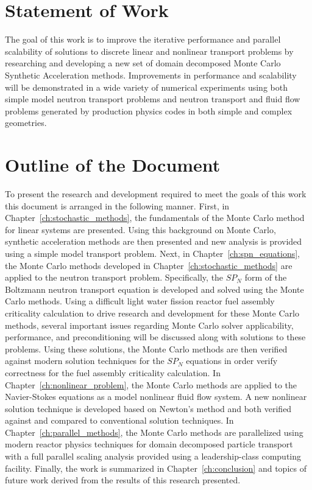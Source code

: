 \section{Statement of Work}
\label{sec:statement_of_work}

The goal of this work is to improve the iterative performance and
parallel scalability of solutions to discrete linear and nonlinear
transport problems by researching and developing a new set of domain
decomposed Monte Carlo Synthetic Acceleration methods. Improvements in
performance and scalability will be demonstrated in a wide variety of
numerical experiments using both simple model neutron transport
problems and neutron transport and fluid flow problems generated by
production physics codes in both simple and complex geometries.

\section{Outline of the Document}
\label{sec:doc_outline}

To present the research and development required to meet the goals of
this work this document is arranged in the following manner. First, in
Chapter~\ref{ch:stochastic_methods}, the fundamentals of the Monte
Carlo method for linear systems are presented. Using this background
on Monte Carlo, synthetic acceleration methods are then presented and
new analysis is provided using a simple model transport problem. Next,
in Chapter~\ref{ch:spn_equations}, the Monte Carlo methods developed
in Chapter~\ref{ch:stochastic_methods} are applied to the neutron
transport problem. Specifically, the $SP_N$ form of the Boltzmann
neutron transport equation is developed and solved using the Monte
Carlo methods. Using a difficult light water fission reactor fuel
assembly criticality calculation to drive research and development for
these Monte Carlo methods, several important issues regarding Monte
Carlo solver applicability, performance, and preconditioning will be
discussed along with solutions to these problems. Using these
solutions, the Monte Carlo methods are then verified against modern
solution techniques for the $SP_N$ equations in order verify
correctness for the fuel assembly criticality calculation. In
Chapter~\ref{ch:nonlinear_problem}, the Monte Carlo methods are
applied to the Navier-Stokes equations as a model nonlinear fluid flow
system. A new nonlinear solution technique is developed based on
Newton's method and both verified against and compared to conventional
solution techniques. In Chapter~\ref{ch:parallel_methods}, the Monte
Carlo methods are parallelized using modern reactor physics techniques
for domain decomposed particle transport with a full parallel scaling
analysis provided using a leadership-class computing
facility. Finally, the work is summarized in
Chapter~\ref{ch:conclusion} and topics of future work derived from the
results of this research presented.
